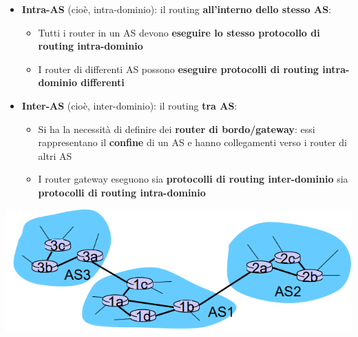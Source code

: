 \documentclass[12pt]{article}
\begin{document}
\begin{itemize}
    \item \textbf{Intra-AS} (cioè, intra-dominio): il routing \textbf{all'interno dello stesso AS}:
    \begin{itemize}
        \item Tutti i router in un AS devono \textbf{eseguire lo stesso protocollo di routing intra-dominio}
        \item I router di differenti AS possono \textbf{eseguire protocolli di routing intra-dominio differenti}
    \end{itemize}
    \item \textbf{Inter-AS} (cioè, inter-dominio): il routing \textbf{tra AS}:
    \begin{itemize}
        \item Si ha la necessità di definire dei \textbf{router di bordo/gateway}: essi rappresentano il \textbf{confine} di un AS e hanno collegamenti verso i router di altri AS
        \item I router gateway eseguono sia \textbf{protocolli di routing inter-dominio} sia \textbf{protocolli di routing intra-dominio}
    \end{itemize}
\end{itemize}
\begin{center}
    \includegraphics[width =0.60\linewidth]{Images/111.png}
\end{center}
\end{document}
